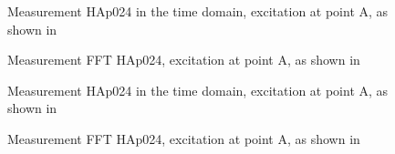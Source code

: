 \begin{figure}[!htb]
    \centering
    
    \caption[Andromeda Measurement HAp024, Time Domain in X-Axis]{Measurement HAp024 in the time domain, excitation at point A, as shown in }
    \label{fig:HAp024_TDat_x}
\end{figure}
\begin{figure}[!htb]
    \centering
    
    \caption[Andromeda Measurement HAp024, FFT in X-Axis]{Measurement FFT HAp024, excitation at point A, as shown in }
    \label{fig:HAp024_FFTa_x}
\end{figure}

\begin{figure}[!htb]
    \centering
    
    \caption[Andromeda Measurement HAp024, Time Domain in Y-Axis]{Measurement HAp024 in the time domain, excitation at point A, as shown in }
    \label{fig:HAp024_TDat_y}
\end{figure}
\begin{figure}[!htb]
    \centering
    
    \caption[Andromeda Measurement HAp024, FFT in Y-Axis]{Measurement FFT HAp024, excitation at point A, as shown in }
    \label{fig:HAp024_FFTa_y}
\end{figure}